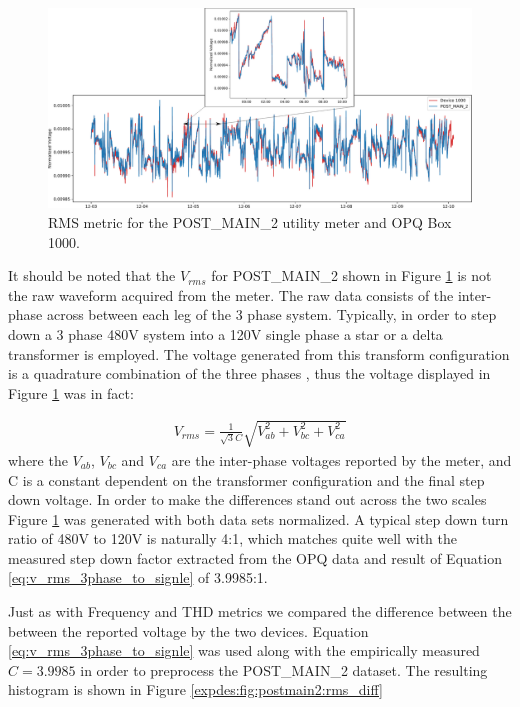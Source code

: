 \begin{figure}[ht!]
    \centering
    \includegraphics[width=1\linewidth]{img/napali_eval/gt/gt_rms.pdf}
    \caption{RMS metric for the POST\_MAIN\_2 utility meter and OPQ Box 1000.}
    \label{expdes:fig:postmain2:rms}
\end{figure}

It should be noted that the $V_{rms}$ for POST\_MAIN\_2 shown in Figure \ref{expdes:fig:postmain2:rms} is not the raw waveform acquired from the meter.
The raw data consists of the inter-phase across between each leg of the 3 phase system.
Typically, in order to step down a 3 phase 480V system into a 120V single phase a star or a delta transformer is employed.
The voltage generated from this transform configuration is a quadrature combination of the three phases \cite{Horowitz:2015:AE:2960712}, thus the voltage displayed in Figure \ref{expdes:fig:postmain2:rms} was in fact:

\begin{equation}\label{eq:v_rms_3phase_to_signle}
\begin{aligned}
    V_{rms} = \frac{1}{\sqrt{3}C}\sqrt{V_{ab}^2 + V_{bc}^2 +V_{ca}^2}
\end{aligned}
\end{equation}
where the $V_{ab}$, $V_{bc}$ and $V_{ca}$ are the inter-phase voltages reported by the meter, and C is a constant dependent on the transformer configuration and the final step down voltage.
In order to make the differences stand out across the two scales Figure \ref{expdes:fig:postmain2:rms} was generated with both data sets normalized.
A typical step down turn ratio of 480V to 120V is naturally 4:1, which matches quite well with the measured step down factor extracted from the OPQ data and result of Equation \ref{eq:v_rms_3phase_to_signle} of 3.9985:1.

Just as with Frequency and THD metrics we compared the difference between the between the reported voltage by the two devices.
Equation \ref{eq:v_rms_3phase_to_signle} was used along with the empirically measured $C = 3.9985$ in order to preprocess the POST\_MAIN\_2 dataset.
The resulting histogram is shown in Figure \ref{expdes:fig:postmain2:rms_diff}

